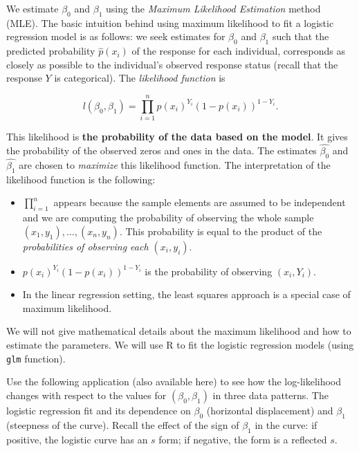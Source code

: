 \documentclass[]{book}
\providecommand{\tightlist}{%
  \setlength{\itemsep}{0pt}\setlength{\parskip}{0pt}}
\newenvironment{rmdblock}[1]
  {\begin{shaded*}
  \begin{itemize}
  \renewcommand{\labelitemi}{
    \raisebox{-.7\height}[0pt][0pt]{
      {\setkeys{Gin}{width=2em,keepaspectratio}\texttt{[image: img/icons/\#1]}}
    }
  }
  \item
  }
  {
  \end{itemize}
  \end{shaded*}
  }
\newenvironment{rmdinsight}
  {\begin{rmdblock}{insight}}
  {\end{rmdblock}}
\theoremstyle{definition}
\theoremstyle{definition}
\theoremstyle{definition}
\theoremstyle{remark}
\begin{document}
We estimate \(\beta_0\) and \(\beta_1\) using the \emph{Maximum
Likelihood Estimation} method (MLE). The basic intuition behind using
maximum likelihood to fit a logistic regression model is as follows: we
seek estimates for \(\beta_0\) and \(\beta_1\) such that the predicted
probability \(\hat{p}(x_i)\) of the response for each individual,
corresponds as closely as possible to the individual's observed response
status (recall that the response \(Y\) is categorical). The
\emph{likelihood function} is

\[ l(\beta_0,\beta_1) = \prod_{i=1}^n p(x_i)^{Y_i}(1-p(x_i))^{1-Y_i}. \]

This likelihood is \textbf{the probability of the data based on the
model}. It gives the probability of the observed zeros and ones in the
data. The estimates \(\hat{\beta_0}\) and \(\hat{\beta_1}\) are chosen
to \emph{maximize} this likelihood function. The interpretation of the
likelihood function is the following:

\begin{itemize}
\tightlist
\item
  \(\prod_{i=1}^n\) appears because the sample elements are assumed to
  be independent and we are computing the probability of observing the
  whole sample \((x_{1},y_1),\ldots,(x_{n},y_n)\). This probability is
  equal to the product of the \emph{probabilities of observing each
  \((x_{i},y_i)\)}.
\item
  \(p(x_i)^{Y_i}(1-p(x_i))^{1-Y_i}\) is the probability of observing
  \((x_{i},Y_i)\).
\end{itemize}

\begin{rmdinsight}
In the linear regression setting, the least squares approach is a
special case of maximum likelihood.
\end{rmdinsight}

We will not give mathematical details about the maximum likelihood and
how to estimate the parameters. We will use R to fit the logistic
regression models (using \texttt{glm} function).

Use the following application (also available here) to see how the
log-likelihood changes with respect to the values for
\((\beta_0,\beta_1)\) in three data patterns. The logistic regression
fit and its dependence on \(\beta_0\) (horizontal displacement) and
\(\beta_1\) (steepness of the curve). Recall the effect of the sign of
\(\beta_1\) in the curve: if positive, the logistic curve has an \(s\)
form; if negative, the form is a reflected \(s\).
\end{document}
